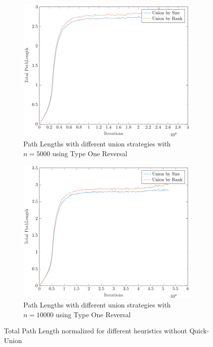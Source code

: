 \begin{figure}[ht]
\begin{subfigure}{0.32\textwidth}
    \end{subfigure}%
    \hfill
    \begin{subfigure}{0.32\textwidth}
        \centering
        \includegraphics[width=\textwidth]{../images/plotTORNonFull5000_PathLength.pdf}
        \caption{Path Lengths with different union strategies with $n = 5000$ using Type One Reversal}
    \end{subfigure}%
    \hfill
    \begin{subfigure}{0.32\textwidth}
        \centering
        \includegraphics[width=\textwidth]{../images/plotTORNonFull10000_PathLength.pdf}
        \caption{Path Lengths with different union strategies with $n = 10000$ using Type One Reversal}
    \end{subfigure}

    \caption{Total Path Length normalized for different heuristics without Quick-Union}
    \label{fig:tplNH}
\end{figure}

